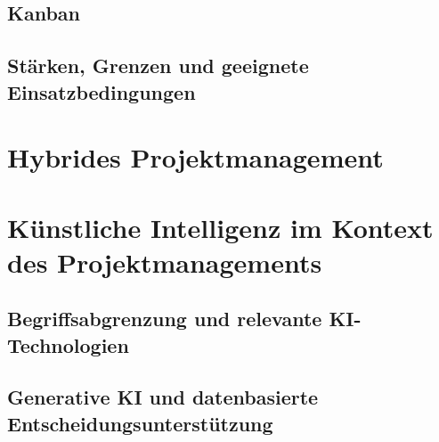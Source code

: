 \subsection{Kanban}
\subsection{Stärken, Grenzen und geeignete Einsatzbedingungen}

\section{Hybrides Projektmanagement}
\label{sec:HybridesProjektmanagement}

\section{Künstliche Intelligenz im Kontext des Projektmanagements}
\label{sec:KIGrundlagen}

\subsection{Begriffsabgrenzung und relevante KI-Technologien}
\subsection{Generative KI und datenbasierte Entscheidungsunterstützung}
